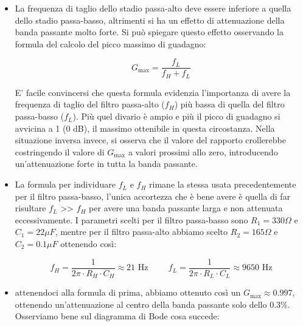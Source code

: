 \documentclass{article}
\begin{document}
    \begin{itemize}
      \item La frequenza di taglio dello stadio passa-alto deve essere inferiore a quella dello stadio passa-basso, altrimenti
            si ha un effetto di attenuazione della banda passante molto forte. Si può spiegare questo effetto osservando la formula
            del calcolo del picco massimo di guadagno:

            \begin{equation}
              \boxed{G_{\max} = \frac{f_{L}}{f_{H} + f_{L}}}
            \end{equation}

            E' facile convincersi che questa formula evidenzia l'importanza di avere la frequenza di taglio del filtro passa-alto ($f_{H}$)
            più bassa di quella del filtro passa-basso ($f_{L}$). Più quel divario è ampio e più il picco di guadagno si avvicina a 1 (0 dB),
            il massimo ottenibile in questa circostanza. Nella situazione inversa invece, si osserva che il valore del rapporto crollerebbe
            costringendo il valore di $G_{\max}$ a valori prossimi allo zero, introducendo un'attenuazione forte in tutta la banda passante.

      \item La formula per individuare $f_{L}$ e $f_{H}$ rimane la stessa usata precedentemente per il filtro passa-basso, l'unica accortezza
            che è bene avere è quella di far risultare $f_{L}$ >> $f_{H}$ per avere una banda passante larga e non attenuata eccessivamente.
            I parametri scelti per il filtro passa-basso sono $R_{1} = 330\Omega$ e $C_{1} = 22 \mu F$,
            mentre per il filtro passa-alto abbiamo scelto $R_{2} = 165\Omega$ e $C_{2} = 0.1 \mu F$ ottenendo così:

            \begin{equation}
              \boxed{f_H = \frac{1}{2\pi \cdot R_H \cdot C_H} \approx 21 \text{ Hz}} \hspace{1cm}
              \boxed{f_L = \frac{1}{2\pi \cdot R_L \cdot C_L} \approx 9650 \text{ Hz}} 
            \end{equation}

      \item attenendoci alla formula di prima, abbiamo ottenuto così un $G_{\max} \approx 0.997$, ottenendo un'attenuazione al centro della banda passante
            solo dello 0.3\%. Osserviamo bene sul diagramma di Bode cosa succede:


\end{itemize}
\end{document}
